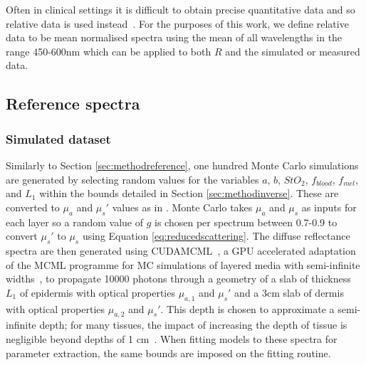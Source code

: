Often in clinical settings it is difficult to obtain precise quantitative data and so relative data is used instead~\citep{Bahl2023}. For the
purposes of this work, we define relative data to be mean normalised spectra using the mean of all wavelengths in the range 450-600nm which can be applied to both $R$ and the simulated or measured data. 
%

\subsection{Reference spectra}\label{sec:methodreference2}
\subsubsection{Simulated dataset}
Similarly to Section \ref{sec:methodreference}, one hundred
Monte Carlo simulations are generated by selecting random values for the variables $a$, $b$, $StO_2$, $f_{blood}$, $f_{mel}$, and $L_1$ within the bounds detailed in Section \ref{sec:methodinverse}.
These are converted to $\mu_a$ and $\mu_s'$ values as in . Monte Carlo takes $\mu_a$ and $\mu_s$ as inputs for each layer so a random value of $g$ is chosen per spectrum between 0.7-0.9 to convert $\mu_s'$ to $\mu_s$ using Equation \eqref{eq:reducedscattering}. The diffuse reflectance spectra are then generated using CUDAMCML~\citep{Alerstam2008}, a GPU accelerated adaptation of the MCML programme for MC simulations of layered media with semi-infinite widths~\citep{Wang1995, Prahl1989}, to propagate 10000 photons through a geometry of a slab of thickness $L_1$ of epidermis with optical properties $\mu_{a,1}$ and $\mu_s'$ and a 3cm slab of dermis with optical properties $\mu_{a, 2}$ and $\mu_s'$. This depth is chosen to approximate a semi-infinite depth; for many tissues, the impact of increasing the depth of tissue is negligible beyond depths of 1 cm~\citep{Zhang2014}. When fitting models to these spectra for parameter extraction, the same bounds are imposed on the fitting routine. 

